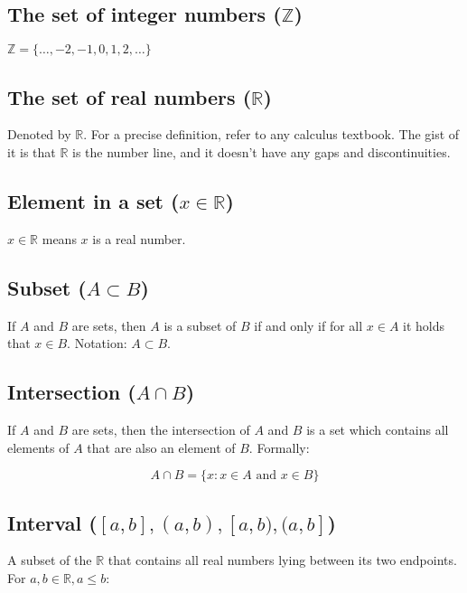 \documentclass[titlepage]{article}
\begin{document}
      \subsection{The set of integer numbers ($\mathbb{Z}$)}
        $\mathbb{Z} = \{ \ldots, -2, -1, 0, 1, 2, \ldots \}$

      \subsection{The set of real numbers ($\mathbb{R}$)}

        Denoted by $\mathbb{R}$. For a precise definition, refer to any
        calculus textbook. The gist of it is that $\mathbb{R}$ is the number
        line, and it doesn't have any gaps and discontinuities.

      \subsection{Element in a set ($x \in \mathbb{R}$)}

        $x \in \mathbb{R}$ means $x$ is a real number.

      \subsection{Subset ($A \subset B$)}

        If $A$ and $B$ are sets, then $A$ is a subset of $B$ if and only if
        for all $x \in A$ it holds that $x \in B$. Notation: $A \subset B$.

      \subsection{Intersection ($A \cap B$)}

        If $A$ and $B$ are sets, then the intersection of $A$ and $B$ is a set
        which contains all elements of $A$ that are also an element of $B$.
        Formally:

        $$A \cap B = \{ x : x \in A \text{ and } x \in B \}$$

      \subsection{Interval ($[a, b], (a, b), [a, b), (a, b]$)}

        A subset of the $\mathbb{R}$ that contains all real numbers lying
        between its two endpoints. For $a, b \in \mathbb{R}, a \leq b$:
\end{document}
